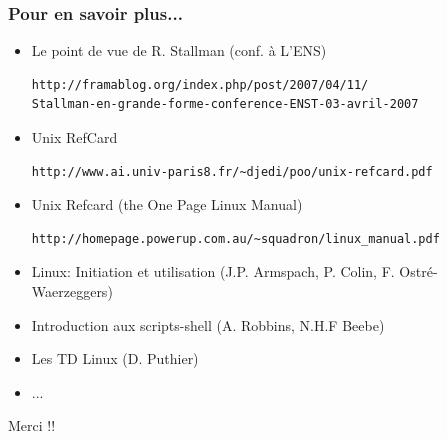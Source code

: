\documentclass[10pt, xcolor=dvipsnames]{beamer}
\begin{document}
\begin{frame}[fragile]
 \frametitle{Pour en savoir plus...}
 \begin{scriptsize}
    \begin{itemize}
          \item Le point de vue de R. Stallman (conf. à L'ENS)
\tiny
\begin{verbatim}
http://framablog.org/index.php/post/2007/04/11/
Stallman-en-grande-forme-conference-ENST-03-avril-2007
\end{verbatim}
\normalsize

          \item Unix RefCard
\tiny
\begin{verbatim}
http://www.ai.univ-paris8.fr/~djedi/poo/unix-refcard.pdf
\end{verbatim}
\normalsize
          \item Unix Refcard (the One Page Linux Manual)
\tiny
\begin{verbatim}
http://homepage.powerup.com.au/~squadron/linux_manual.pdf
\end{verbatim}
\normalsize
          \item Linux: Initiation et utilisation (J.P. Armspach, P. Colin, F. Ostré-Waerzeggers)
          \item Introduction aux scripts-shell (A. Robbins, N.H.F Beebe)
          \item Les TD Linux (D. Puthier)
          \item ...
    \end{itemize}
 \end{scriptsize}
\end{frame}


\frame
{
\begin{block}{}
\begin{center}
\begin{huge}
Merci !!
 \end{huge}
\end{center}
\end{block}

}
\end{document}

